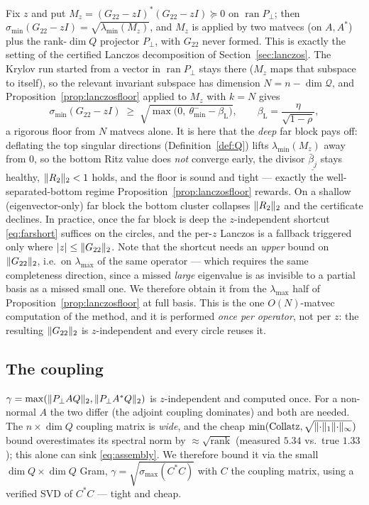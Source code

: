 \documentclass[11pt]{article}
\newcommand{\sigmin}{\sigma_{\min}}
\newcommand{\sigmax}{\sigma_{\max}}
\DeclarePairedDelimiter{\norm}{\lVert}{\rVert}
\DeclarePairedDelimiter{\abs}{\lvert}{\rvert}
\begin{document}
Fix $z$ and put $M_z=(G_{22}-zI)^*(G_{22}-zI)\succeq0$ on $\operatorname{ran}P_\perp$; then
$\sigmin(G_{22}-zI)=\sqrt{\lambda_{\min}(M_z)}$, and $M_z$ is applied by two matvecs (on $A,A^*$) plus
the rank-$\dim Q$ projector $P_\perp$, with $G_{22}$ never formed. This is exactly the setting of the
certified Lanczos decomposition of Section~\ref{sec:lanczos}. The Krylov run started from a vector in
$\operatorname{ran}P_\perp$ stays there ($M_z$ maps that subspace to itself), so the relevant invariant
subspace has dimension $N=n-\dim\mathcal Q$, and Proposition~\ref{prop:lanczosfloor} applied to $M_z$
with $k=N$ gives
\[
  \sigmin(G_{22}-zI)\;\ge\;\sqrt{\max\!\big(0,\ \theta_{\min}^--\beta_{\mathrm L}\big)},
  \qquad \beta_{\mathrm L}=\frac{\eta}{\sqrt{1-\rho}},
\]
a rigorous floor from $N$ matvecs alone. It is here that the \emph{deep} far block pays off: deflating the
top singular directions (Definition~\ref{def:Q}) lifts $\lambda_{\min}(M_z)$ away from $0$, so the
bottom Ritz value does \emph{not} converge early, the divisor $\underline{\bar\beta_j}$ stays healthy,
$\norm{R_2}_2<1$ holds, and the floor is sound and tight --- exactly the well-separated-bottom regime
Proposition~\ref{prop:lanczosfloor} rewards. On a shallow (eigenvector-only) far block the bottom
cluster collapses $\norm{R_2}_2$ and the certificate declines. In practice, once the far block is deep
the $z$-independent shortcut \eqref{eq:farshort} suffices on the circles, and the per-$z$ Lanczos is a
fallback triggered only where $\abs{z}\le\norm{G_{22}}_2$. Note that the shortcut needs an \emph{upper}
bound on $\norm{G_{22}}_2$, i.e.\ on $\lambda_{\max}$ of the same operator --- which requires the same
completeness direction, since a missed \emph{large} eigenvalue is as invisible to a partial basis as a
missed small one. We therefore obtain it from the $\lambda_{\max}$ half of
Proposition~\ref{prop:lanczosfloor} at full basis. This is the one $O(N)$-matvec computation of the
method, and it is performed \emph{once per operator}, not per $z$: the resulting $\norm{G_{22}}_2$ is
$z$-independent and every circle reuses it.

\subsection{The coupling}\label{sec:coupling}

$\gamma=\max(\norm{P_\perp AQ}_2,\norm{P_\perp A^*Q}_2)$ is $z$-independent and computed once. For a
non-normal $A$ the two differ (the adjoint coupling dominates) and both are needed. The $n\times\dim Q$
coupling matrix is \emph{wide}, and the cheap $\min(\text{Collatz},\sqrt{\norm{\cdot}_1\norm{\cdot}_\infty})$
bound overestimates its spectral norm by $\approx\sqrt{\text{rank}}$ (measured $5.34$ vs.\ true $1.33$);
this alone can sink \eqref{eq:assembly}. We therefore bound it via the small $\dim Q\times\dim Q$ Gram,
$\gamma=\sqrt{\sigmax(C^*C)}$ with $C$ the coupling matrix, using a verified SVD of $C^*C$ --- tight and
cheap.
\end{document}
